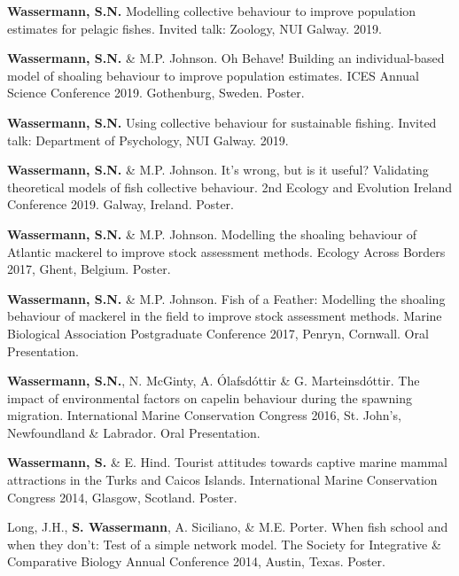 \documentclass[a4paper]{deedy-resume} %
\begin{document}
\begin{flushleft}
\begin{tightitemize}
\item \textbf{Wassermann, S.N.} Modelling collective behaviour to improve population estimates for pelagic fishes. Invited talk: Zoology, NUI Galway. 2019.
\item \textbf{Wassermann, S.N.} \& M.P. Johnson. Oh Behave! Building an individual-based model of shoaling behaviour to improve population estimates. ICES Annual Science Conference 2019. Gothenburg, Sweden. Poster.
\item \textbf{Wassermann, S.N.} Using collective behaviour for sustainable fishing. Invited talk: Department of Psychology, NUI Galway. 2019.
\item \textbf{Wassermann, S.N.} \& M.P. Johnson. It's wrong, but is it useful? Validating theoretical models of fish collective behaviour. 2nd Ecology and Evolution Ireland Conference 2019. Galway, Ireland. Poster.
\item \textbf{Wassermann, S.N.} \& M.P. Johnson. Modelling the shoaling behaviour of Atlantic mackerel to improve stock assessment methods. Ecology Across Borders 2017, Ghent, Belgium. Poster.
\item \textbf{Wassermann, S.N.} \& M.P. Johnson. Fish of a Feather: Modelling the shoaling behaviour of mackerel in the field to improve stock assessment methods. Marine Biological Association Postgraduate Conference 2017, Penryn, Cornwall. Oral Presentation.
\item \textbf{Wassermann, S.N.}, N. McGinty, A. \'{O}lafsd\'{o}ttir \& G. Marteinsd\'{o}ttir. The impact of environmental factors on capelin behaviour during the spawning migration. International Marine Conservation Congress 2016, St. John's, Newfoundland \& Labrador. Oral Presentation.
\item \textbf{Wassermann, S.} \& E. Hind. Tourist attitudes towards captive marine mammal attractions in the Turks and Caicos Islands. International Marine Conservation Congress 2014, Glasgow, Scotland. Poster.
\item Long, J.H., \textbf{S. Wassermann}, A. Siciliano, \& M.E. Porter. When fish school and when they don't: Test of a simple network model. The Society for Integrative \& Comparative Biology Annual Conference 2014, Austin, Texas. Poster.
\end{tightitemize}

\sectionspace


\end{flushleft}
\end{document}
